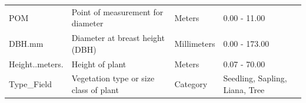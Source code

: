 \documentclass[
  12pt,
]{article}
\begin{document}
\begin{longtable}[]{@{}llll@{}}
\begin{minipage}[t]{0.18\columnwidth}
POM\strut
\end{minipage} & \begin{minipage}[t]{0.35\columnwidth}\raggedright
Point of measurement for diameter\strut
\end{minipage} & \begin{minipage}[t]{0.18\columnwidth}\raggedright
Meters\strut
\end{minipage} & \begin{minipage}[t]{0.18\columnwidth}\raggedright
0.00 - 11.00\strut
\end{minipage}\tabularnewline
\begin{minipage}[t]{0.18\columnwidth}\raggedright
DBH.mm\strut
\end{minipage} & \begin{minipage}[t]{0.35\columnwidth}\raggedright
Diameter at breast height (DBH)\strut
\end{minipage} & \begin{minipage}[t]{0.18\columnwidth}\raggedright
Millimeters\strut
\end{minipage} & \begin{minipage}[t]{0.18\columnwidth}\raggedright
0.00 - 173.00\strut
\end{minipage}\tabularnewline
\begin{minipage}[t]{0.18\columnwidth}\raggedright
Height..meters.\strut
\end{minipage} & \begin{minipage}[t]{0.35\columnwidth}\raggedright
Height of plant\strut
\end{minipage} & \begin{minipage}[t]{0.18\columnwidth}\raggedright
Meters\strut
\end{minipage} & \begin{minipage}[t]{0.18\columnwidth}\raggedright
0.07 - 70.00\strut
\end{minipage}\tabularnewline
\begin{minipage}[t]{0.18\columnwidth}\raggedright
Type\_Field\strut
\end{minipage} & \begin{minipage}[t]{0.35\columnwidth}\raggedright
Vegetation type or size class of plant\strut
\end{minipage} & \begin{minipage}[t]{0.18\columnwidth}\raggedright
Category\strut
\end{minipage} & \begin{minipage}[t]{0.18\columnwidth}\raggedright
Seedling, Sapling, Liana, Tree\strut

\end{minipage}
\end{longtable}
\end{document}

